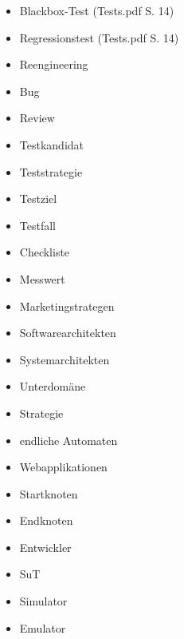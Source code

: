 \begin{itemize}
\item Blackbox-Test (Tests.pdf S. 14)
\item Regressionstest (Tests.pdf S. 14)
\item Reengineering
\item Bug
\item Review
\item Testkandidat
\item Teststrategie
\item Testziel
\item Testfall
\item Checkliste
\item Messwert
\item Marketingstrategen
\item Softwarearchitekten 
\item Systemarchitekten
\item Unterdomäne
\item Strategie
\item endliche Automaten
\item Webapplikationen
\item Startknoten
\item Endknoten
\item Entwickler
\item SuT
\item Simulator
\item Emulator
\end{itemize}